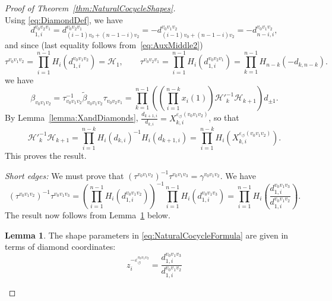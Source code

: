 \documentclass[12pt]{amsart}
\theoremstyle{definition}
\newtheorem{lemma}[theorem]{Lemma}
\numberwithin{equation}{section}
\begin{document}
\begin{proof}[Proof of Theorem~\ref{thm:NaturalCocycleShapes}]
\begin{equation}
\end{equation}
Using \eqref{eq:DiamondDef}, we have
\begin{equation}\label{eq:AuxMiddle2}
d_{1,i}^{v_0v_2v_1}=d_{(i-1)v_0+(n-1-i)v_2}^{v_0v_2v_1}=-d_{(i-1)v_0+(n-1-i)v_2}^{v_0v_1v_2}=-d_{n-i,i}^{v_0v_1v_2},
\end{equation}
and since (last equality follows from~\eqref{eq:AuxMiddle2})
\begin{equation}
\tau^{v_0v_1v_2}=\prod_{i=1}^{n-1}H_i(d^{v_0v_1v_2}_{1,i})=\mathcal H_1,\qquad \tau^{v_0v_2v_1}=\prod_{i=1}^{n-1}H_i(d^{v_0v_2v_1}_{1,i})=\prod_{k=1}^{n-1}H_{n-k}(-d_{k,n-k}).
\end{equation}
we have
\begin{equation}
\beta_{v_0v_1v_2}=\tau^{-1}_{v_0v_1v_2}\widetilde\beta_{v_0v_1v_2}\tau_{v_0v_2v_1} = \prod_{k=1}^{n-1}\left(\left(\prod_{i=1}^{n-k}x_i(1)\right)\mathcal H'^{-1}_k \mathcal H_{k+1}\right)d_{\pm 1}.
\end{equation}
By Lemma~\ref{lemma:XandDiamonds}, $\frac{d_{k+1,i}}{d_{k,i}}=X_{k,i}^{\varepsilon_\circlearrowleft(v_0v_1v_2)}$, so that
\begin{equation}
\mathcal H'^{-1}_k \mathcal H_{k+1} = \prod_{i=1}^{n-k} H_i(d_{k,i})^{-1} H_i(d_{k+1,i}) = \prod_{i=1}^{n-k} H_i(X_{k,i}^{\varepsilon_\circlearrowleft(v_0v_1v_2)}).
\end{equation}
This proves the result.



\textit{Short edges:} We must prove that $(\tau^{v_0v_1v_2})^{-1}\tau^{v_0v_1v_3}=\gamma^{v_0v_1v_2}$. We have
\begin{equation}
(\tau^{v_0v_1v_2})^{-1}\tau^{v_0v_1v_3}=\left(\prod_{i=1}^{n-1}H_i(d^{v_0v_1v_2}_{1,i})\right)^{-1}\prod_{i=1}^{n-1}H_i(d^{v_0v_1v_3}_{1,i})=\prod_{i=1}^{n-1}H_i(\frac{d^{v_0v_1v_3}_{1,i}}{d^{v_0v_1v_2}_{1,i}}).
\end{equation}
The result now follows from Lemma~\ref{ShapesandDiamonds} below.

\begin{lemma}\label{ShapesandDiamonds}
The shape parameters in \eqref{eq:NaturalCocycleFormula} are given in terms of diamond coordinates:
\begin{equation}
z_{i}^{-\varepsilon^{v_0v_1v_2}_\circlearrowleft}=\frac{d^{v_0v_1v_3}_{1,i}}{d^{v_0v_1v_2}_{1,i}}
\end{equation}
\end{lemma}


\end{proof}
\end{document}
